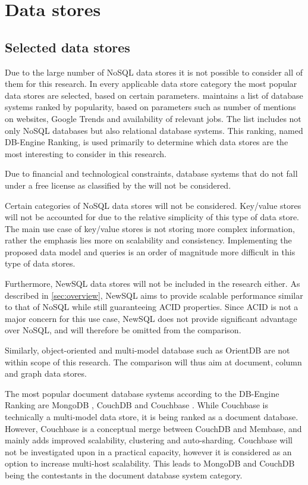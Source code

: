 \section{Data stores}
\label{sec:data-stores}

\subsection{Selected data stores}
\label{sec:selected-data-stores}

Due to the large number of NoSQL data stores it is not possible to consider all of them for this research. In every applicable data store category the most popular data stores are selected, based on certain parameters. \textcite{DBEngine2018} maintains a list of database systems ranked by popularity, based on parameters such as number of mentions on websites, Google Trends and availability of relevant jobs. The list includes not only NoSQL databases but also relational database systems. This ranking, named DB-Engine Ranking, is used primarily to determine which data stores are the most interesting to consider in this research.

Due to financial and technological constraints, database systems that do not fall under a free license as classified by the \textcite{FreeSoftwareFoundation1985} will not be considered.

Certain categories of NoSQL data stores will not be considered. Key/value stores will not be accounted for due to the relative simplicity of this type of data store. The main use case of key/value stores is not storing more complex information, rather the emphasis lies more on scalability and consistency. Implementing the proposed data model and queries is an order of magnitude more difficult in this type of data stores.

Furthermore, NewSQL data stores will not be included in the research either. As described in \cref{sec:overview}, NewSQL aims to provide scalable performance similar to that of NoSQL while still guaranteeing ACID properties. Since ACID is not a major concern for this use case, NewSQL does not provide significant advantage over NoSQL, and will therefore be omitted from the comparison.

Similarly, object-oriented and multi-model database such as OrientDB \autocite{OrientDB2010} are not within scope of this research. The comparison will thus aim at document, column and graph data stores.

The most popular document database systems according to the DB-Engine Ranking are MongoDB \autocite{MongoDB2009}, CouchDB \autocite{CouchDB2005} and Couchbase \autocite{Couchbase2010}. While Couchbase is technically a multi-model data store, it is being ranked as a document database. However, Couchbase is a conceptual merge between CouchDB and Membase, and mainly adds improved scalability, clustering and auto-sharding. Couchbase will not be investigated upon in a practical capacity, however it is considered as an option to increase multi-host scalability. This leads to MongoDB and CouchDB being the contestants in the document database system category.

